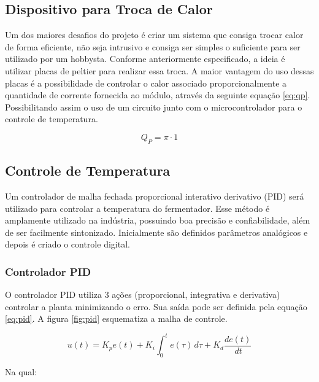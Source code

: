 \subsection{Dispositivo para Troca de Calor}

Um dos maiores desafios do projeto é criar um sistema que consiga trocar calor de forma eficiente, não seja intrusivo e consiga ser simples o suficiente para ser utilizado por um hobbysta. Conforme anteriormente especificado, a ideia é utilizar placas de peltier para realizar essa troca. A maior vantagem do uso dessas placas é a possibilidade de controlar o calor associado proporcionalmente a quantidade de corrente fornecida ao módulo, através da seguinte equação \ref{eq:qp}. Possibilitando assim o uso de um circuito junto com o microcontrolador para o controle de temperatura.

\begin{equation}
    Q_P = \pi \cdot 1
    \label{eq:qp}
\end{equation}


\subsection{Controle de Temperatura}

Um controlador de malha fechada proporcional interativo derivativo (PID) será utilizado para controlar a temperatura do fermentador. Esse método é amplamente utilizado na indústria, possuindo boa precisão e confiabilidade, além de ser facilmente sintonizado. Inicialmente são definidos parâmetros analógicos e depois é criado o controle digital.

\subsubsection{Controlador PID}

O controlador PID utiliza 3 ações (proporcional, integrativa e derivativa) controlar a planta minimizando o erro. Sua saída pode ser definida pela equação \ref{eq:pid}. A figura \ref{fig:pid} esquematiza a malha de controle.

\begin{equation}
    u(t) = K_pe(t) + K_i  \int_{0}^{t} e(\tau) \, d\tau + K_d\dfrac{de(t)}{\, dt}
    \label{eq:pid}
\end{equation}

Na qual:

